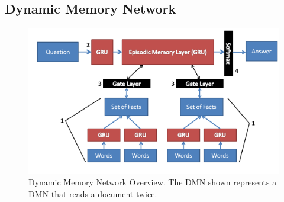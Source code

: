 \documentclass{article}
\begin{document}
\subsection{Dynamic Memory Network}

\begin{figure}
  \centering
    \includegraphics[width=1\textwidth]{images/dynam_mem_net}
      \caption{Dynamic Memory Network Overview.  The DMN shown represents a DMN that reads a document twice.}    
      \label{Fig:dmn}
\end{figure}
\end{document}
